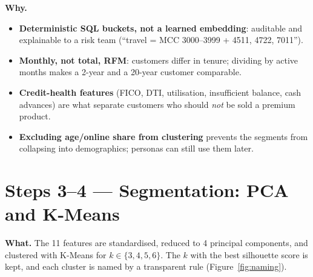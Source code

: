 \documentclass[11pt,a4paper]{article}
\newcommand{\why}[1]{\par\needspace{6\baselineskip}\smallskip\noindent\textbf{\textcolor{ca}{Why.}} #1\par}
\begin{document}
\why{
\begin{itemize}
\item \textbf{Deterministic SQL buckets, not a learned embedding}: auditable and explainable to a risk team (``travel = MCC 3000--3999 + 4511, 4722, 7011'').
\item \textbf{Monthly, not total, RFM}: customers differ in tenure; dividing by active months makes a 2-year and a 20-year customer comparable.
\item \textbf{Credit-health features} (FICO, DTI, utilisation, insufficient balance, cash advances) are what separate customers who should \emph{not} be sold a premium product.
\item \textbf{Excluding age/online share from clustering} prevents the segments from collapsing into demographics; personas can still use them later.
\end{itemize}}

\section{Steps 3--4 --- Segmentation: PCA and K-Means}

\textbf{What.} The 11 features are standardised, reduced to 4 principal components, and clustered with K-Means for
$k \in \{3,4,5,6\}$. The $k$ with the best silhouette score is kept, and each cluster is named by a transparent rule
(Figure~\ref{fig:naming}).
\end{document}
